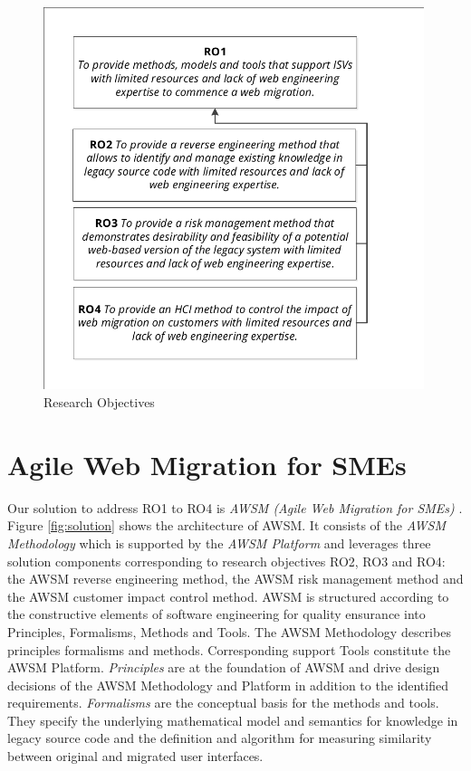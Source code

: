 \begin{figure}
\hypertarget{fig:objectives}{%
\centering
\includegraphics[width=0.99\textwidth]{../figures/objectives.pdf}
\caption{Research Objectives}\label{fig:objectives}
}
\end{figure}

\hypertarget{sec:solution-overview}{%
\section{Agile Web Migration for SMEs}\label{sec:solution-overview}}

Our solution to address RO1 to RO4 is \emph{AWSM (Agile Web Migration for SMEs)} \autocite{Heil2016AWSM}.
Figure \cref{fig:solution} shows the architecture of AWSM.
It consists of the \emph{AWSM Methodology} which is supported by the \emph{AWSM Platform} and leverages three solution components corresponding to research objectives RO2, RO3 and RO4: the AWSM reverse engineering method, the AWSM risk management method and the AWSM customer impact control method.
AWSM is structured according to the constructive elements of software engineering for quality ensurance \autocite{Wallmueller2001SoftwareQuality} into Principles, Formalisms, Methods and Tools.
The AWSM Methodology describes principles formalisms and methods.
Corresponding support Tools constitute the AWSM Platform.
\emph{Principles} are at the foundation of AWSM and drive design decisions of the AWSM Methodology and Platform in addition to the identified requirements.
\emph{Formalisms} are the conceptual basis for the methods and tools.
They specify the underlying mathematical model and semantics for knowledge in legacy source code and the definition and algorithm for measuring similarity between original and migrated user interfaces.

